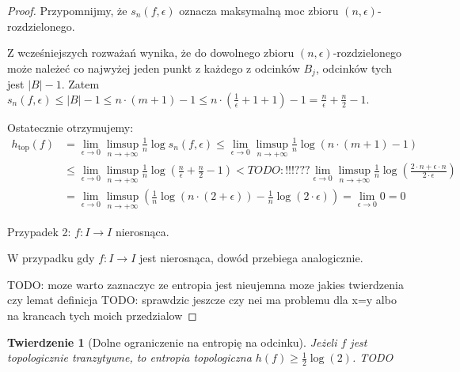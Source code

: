 \documentclass[licencjacka]{pwr_wmat_praca_dyplomowa}
\theoremstyle{plain}
\newtheorem{theorem}{Twierdzenie}
\numberwithin{theorem}{chapter}
\theoremstyle{definition}
\numberwithin{theorem}{chapter}
\begin{document}
\begin{proof}
Przypomnijmy, że $s_n(f, \epsilon)$ oznacza maksymalną moc zbioru $(n, \epsilon)$-rozdzielonego. 


Z wcześniejszych rozważań wynika, że do dowolnego zbioru $(n, \epsilon)$-rozdzielonego może należeć co najwyżej jeden punkt z każdego z odcinków $B_j$, odcinków tych jest $|B|-1.$ Zatem $s_n(f, \epsilon) \leq |B|-1 \leq n \cdot (m+1) - 1 \leq n \cdot (\frac{1}{\epsilon}+1+1) - 1 = \frac{n}{\epsilon} + \frac{n}{2} - 1.$



Ostatecznie otrzymujemy:
\begin{equation}
\begin{aligned}
h_{\textrm{top}}(f) & = \lim_{\epsilon \rightarrow 0} \limsup_{n \rightarrow +\infty} \frac{1}{n} \log s_n(f, \epsilon) \leq \lim_{\epsilon \rightarrow 0} \limsup_{n \rightarrow +\infty} \frac{1}{n} \log ( n \cdot (m+1) - 1 ) \\
& \leq \lim_{\epsilon \rightarrow 0} \limsup_{n \rightarrow +\infty} \frac{1}{n} \log ( \frac{n}{\epsilon} + \frac{n}{2} - 1 ) <TODO:!!!??? \lim_{\epsilon \rightarrow 0} \limsup_{n \rightarrow +\infty} \frac{1}{n} \log ( \frac{2 \cdot n + \epsilon \cdot n}{2 \cdot \epsilon}) \\
& = \lim_{\epsilon \rightarrow 0} \limsup_{n \rightarrow +\infty} (\frac{1}{n} \log (n \cdot (2 + \epsilon)) - \frac{1}{n} \log ( 2 \cdot \epsilon )) = \lim_{\epsilon \rightarrow 0} 0 = 0
\end{aligned}
\end{equation}

\item[Przypadek 2: $f: I \rightarrow I$ nierosnąca.]

W przypadku gdy $f: I \rightarrow I$ jest nierosnąca, dowód przebiega analogicznie.

TODO: moze warto zaznaczyc ze entropia jest nieujemna moze jakies twierdzenia czy lemat definicja
TODO: sprawdzic jeszcze czy nei ma problemu dla x=y albo na krancach tych moich przedzialow

\end{proof}
 
 
 
 
\begin{theorem}[Dolne ograniczenie na entropię na odcinku] \label{dolne_ograniczenie_entropii_na_odcinku}
\cite{ruette2017chaos}
Jeżeli $f$ jest topologicznie tranzytywne, to entropia topologiczna $h(f) \geq \frac{1}{2} \log(2)$.
TODO
\end{theorem}
\end{document}
